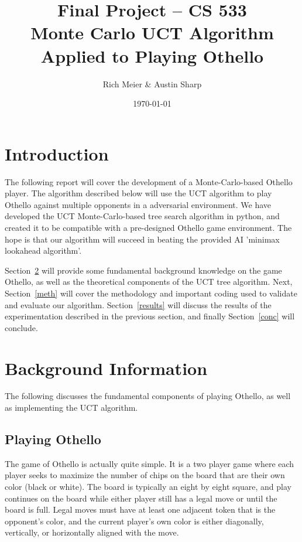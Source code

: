 \documentclass[12pt,letterpaper]{article}
\begin{document}
\title{\vspace{-1in}Final Project -- CS 533 \\ Monte Carlo UCT Algorithm Applied to Playing Othello}
\author{Rich Meier \& Austin Sharp}
\date{\today}
\maketitle

\vspace{-.5in}
\section{Introduction}
The following report will cover the development of a Monte-Carlo-based Othello player. The algorithm described below will use the UCT algorithm to play Othello against multiple opponents in a adversarial environment. We have developed the UCT Monte-Carlo-based tree search algorithm in python, and created it to be compatible with a pre-designed Othello game environment. The hope is that our algorithm will succeed in beating the provided AI 'minimax lookahead algorithm'.

Section~\ref{back} will provide some fundamental background knowledge on the game Othello, as well as the theoretical components of the UCT tree algorithm.  Next, Section~\ref{meth} will cover the methodology and important coding used to validate and evaluate our algorithm. Section~\ref{results} will discuss the results of the experimentation described in the previous section, and finally Section~\ref{conc} will conclude.

\section{Background Information}
\label{back}

The following discusses the fundamental components of playing Othello, as well as implementing the UCT algorithm.

\subsection{Playing Othello}

The game of Othello is actually quite simple. It is a two player game where each player seeks to maximize the number of chips on the board that are their own color (black or white). The board is typically an eight by eight square, and play continues on the board while either player still has a legal move or until the board is full. Legal moves must have at least one adjacent token that is the opponent's color, and the current player's own color is either diagonally, vertically, or horizontally aligned with the move.  
\end{document}
